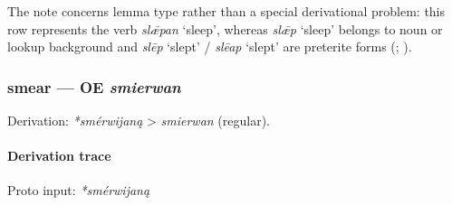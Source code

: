\documentclass[
  british,
  a4paper,
]{article}
\begin{document}
The note concerns lemma type rather than a special derivational problem:
this row represents the verb \emph{slǣpan} `sleep', whereas \emph{slǣp}
`sleep' belongs to noun or lookup background and \emph{slēp} `slept' /
\emph{slēap} `slept' are preterite forms
(;
).

\subsubsection{\texorpdfstring{smear --- OE
\emph{smierwan}}{smear --- OE smierwan}}\label{smear-oe-smierwan}

Derivation: \emph{*smérwijaną} \textgreater{} \emph{smierwan} (regular).

\paragraph{Derivation trace}\label{derivation-trace-55}

Proto input: \emph{*smérwijaną}

\begingroup
\setlength{\fboxsep}{6pt}
\end{document}
